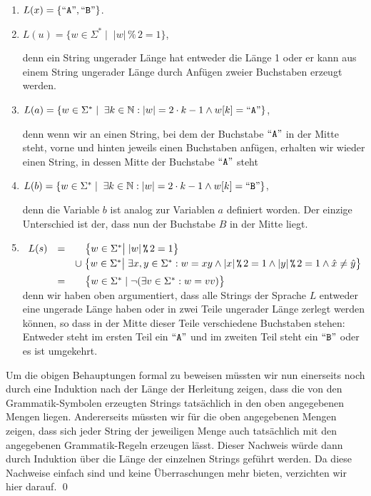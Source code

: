 \begin{enumerate}
\item $L(x) = \{ \mbox{``\texttt{A}''}, \mbox{``\texttt{B}''} \}$.
\item $L(u) = \{ w \in \Sigma^* \mid \;|w| \,\texttt{\%}\, 2 = 1 \}$,

      denn ein String ungerader L\"ange hat entweder die L\"ange 1 oder er kann aus einem String ungerader L\"ange
      durch Anf\"ugen zweier Buchstaben erzeugt werden.
\item $L(a) = \{ w \in \Sigma^* \mid\; \exists k \in \mathbb{N}: |w| = 2 \cdot k - 1 \wedge w[k] = \mbox{``\texttt{A}''} \}$,
  
      denn wenn wir an einen String, bei dem der Buchstabe $\mbox{``\texttt{A}''}$ in der Mitte steht, vorne
      und hinten jeweils einen Buchstaben anf\"ugen, erhalten wir wieder einen String, in
      dessen Mitte der Buchstabe $\mbox{``\texttt{A}''}$ steht
\item $L(b) = \{ w \in \Sigma^* \mid\; \exists k \in \mathbb{N}: |w| = 2 \cdot k - 1 \wedge w[k] = \mbox{``\texttt{B}''} \}$,

      denn die Variable $b$ ist analog zur Variablen $a$ definiert worden.  Der einzige
      Unterschied ist der, dass nun der Buchstabe $B$ in der Mitte liegt.
\item $
  \begin{array}[t]{lcl}    
L(s) & = & \quad \bigl\{ w \in \Sigma^* \big|\; |w| \,\texttt{\%}\, 2 = 1 \bigr\} \\[0.1cm] 
     &   & \cup\; \bigl\{ w \in \Sigma^* \big|\; \exists x,y \in \Sigma^*: 
                          w = xy \wedge |x| \,\texttt{\%}\, 2 = 1 
                                 \wedge |y| \,\texttt{\%}\, 2 = 1  \wedge \hat{x} \not= \hat{y} \bigr\} \\[0.2cm]
     & = & \quad \bigl\{ w \in \Sigma^* \mid \neg (\exists v \in \Sigma^*: w = vv) \bigr\}
  \end{array}
$
      \\[0.2cm]
      denn wir haben oben argumentiert, dass alle Strings der Sprache $L$ entweder eine
      ungerade L\"ange haben oder in zwei Teile ungerader L\"ange zerlegt werden k\"onnen, so dass in der Mitte
      dieser Teile verschiedene Buchstaben stehen: Entweder steht im ersten Teil ein $\mbox{``\texttt{A}''}$
      und im zweiten Teil steht ein $\mbox{``\texttt{B}''}$ oder es ist umgekehrt.
\end{enumerate}
Um die obigen Behauptungen formal zu beweisen m\"ussten wir nun einerseits noch durch eine Induktion
nach der L\"ange der Herleitung zeigen, dass die von den Grammatik-Symbolen erzeugten
Strings tats\"achlich in den oben angegebenen Mengen liegen.  Andererseits m\"ussten wir f\"ur
die oben angegebenen Mengen zeigen, dass sich jeder String der jeweiligen Menge auch tats\"achlich mit den
angegebenen Grammatik-Regeln erzeugen l\"asst.  Dieser Nachweis w\"urde dann durch Induktion \"uber die L\"ange der
einzelnen Strings gef\"uhrt werden.  Da diese Nachweise einfach sind und keine
\"Uberraschungen mehr bieten, verzichten wir hier darauf.
\qed

